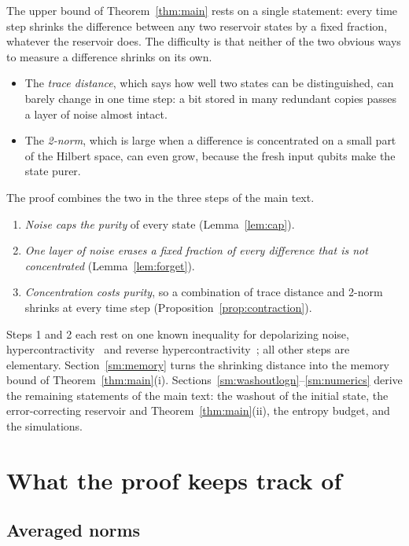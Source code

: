 \documentclass[aps,prl,twocolumn,superscriptaddress,floatfix]{revtex4-2}
\theoremstyle{plain}
\begin{document}
The upper bound of Theorem~\ref{thm:main} rests on a single statement: every time step shrinks the difference between any two reservoir states by a fixed fraction, whatever the reservoir does. The difficulty is that neither of the two obvious ways to measure a difference shrinks on its own.
\begin{itemize}
\item The \emph{trace distance}, which says how well two states can be distinguished, can barely change in one time step: a bit stored in many redundant copies passes a layer of noise almost intact.
\item The \emph{2-norm}, which is large when a difference is concentrated on a small part of the Hilbert space, can even grow, because the fresh input qubits make the state purer.
\end{itemize}
The proof combines the two in the three steps of the main text.
\begin{enumerate}
\item \emph{Noise caps the purity} of every state (Lemma~\ref{lem:cap}).
\item \emph{One layer of noise erases a fixed fraction of every difference that is not concentrated} (Lemma~\ref{lem:forget}).
\item \emph{Concentration costs purity}, so a combination of trace distance and 2-norm shrinks at every time step (Proposition~\ref{prop:contraction}).
\end{enumerate}
Steps 1 and 2 each rest on one known inequality for depolarizing noise, hypercontractivity~\cite{King2014} and reverse hypercontractivity~\cite{Cubitt2015}; all other steps are elementary. Section~\ref{sm:memory} turns the shrinking distance into the memory bound of Theorem~\ref{thm:main}(i). Sections~\ref{sm:washoutlogn}--\ref{sm:numerics} derive the remaining statements of the main text: the washout of the initial state, the error-correcting reservoir and Theorem~\ref{thm:main}(ii), the entropy budget, and the simulations.

\section{What the proof keeps track of}
\label{sm:norms}

\subsection{Averaged norms}
\end{document}
